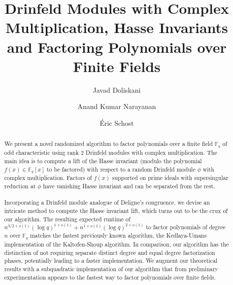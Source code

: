 \documentclass{article}
\title{Drinfeld Modules with Complex Multiplication, Hasse Invariants and Factoring Polynomials over Finite Fields}
\author[1]{Javad Doliskani}
\author[2]{Anand Kumar Narayanan}
\author[3]{\'Eric Schost}
\affil[1]{\small Institute for Quantum Computing, University of Waterloo}
\affil[2]{\small Computing and Mathematical Sciences, Caltech}
\affil[3]{\small Computer Science Department, University of Waterloo}
\date{}
\theoremstyle{plain}
\theoremstyle{definition}
\def\F{\ensuremath{\mathbb{F}}}
\begin{document}
\maketitle

\begin{abstract}
We present a novel randomized algorithm to factor polynomials over a finite field $\F_q$ of odd characteristic using rank $2$ Drinfeld modules with complex multiplication. The main idea is to compute a lift of the Hasse invariant (modulo the polynomial $f(x) \in \F_q[x]$ to be factored) with respect to a random Drinfeld module $\phi$ with complex multiplication. Factors of $f(x)$ supported on prime ideals with supersingular reduction at $\phi$ have vanishing Hasse invariant and can be separated from the rest.\\ \\


\noindent Incorporating a Drinfeld module analogue of Deligne's congruence, we devise an intricate method to compute the Hasse invariant lift, which turns out to be the crux of our algorithm. The resulting expected runtime of $n^{3/2+o(1)} (\log q)^{1+o(1)}+n^{1+o(1)} (\log q)^{2+o(1)}$ to factor polynomials of degree $n$ over $\F_q$ matches the fastest previously known algorithm, the Kedlaya-Umans implementation of the Kaltofen-Shoup algorithm. In comparison, our algorithm has the distinction of not requiring separate distinct degree and equal degree factorization phases, potentially leading to a faster implementation. We augment our theoretical results with a subquadratic implementation of our algorithm that from preliminary experimentation appears to the fastest way to factor polynomials over finite fields.

 
\end{abstract}
\end{document}
